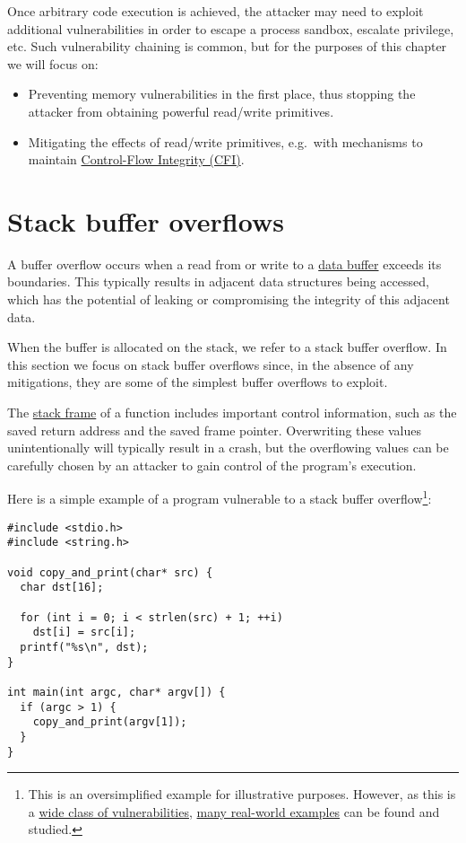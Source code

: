 \documentclass[a4paper,]{report}
\providecommand{\tightlist}{%
  \setlength{\itemsep}{0pt}\setlength{\parskip}{0pt}}
\begin{document}
Once arbitrary code execution is achieved, the attacker may need to
exploit additional vulnerabilities in order to escape a process sandbox,
escalate privilege, etc. Such vulnerability chaining is common, but for
the purposes of this chapter we will focus on:

\begin{itemize}
\tightlist
\item
  Preventing memory vulnerabilities in the first place, thus stopping
  the attacker from obtaining powerful read/write primitives.
\item
  Mitigating the effects of read/write primitives, e.g.~with mechanisms
  to maintain \protect\hyperlink{cfi}{Control-Flow Integrity (CFI)}.
\end{itemize}

\hypertarget{stack-buffer-overflows}{%
\section{Stack buffer overflows}\label{stack-buffer-overflows}}

A buffer overflow occurs when a read from or write to a
\href{https://en.wikipedia.org/wiki/Data_buffer}{data buffer} exceeds
its boundaries. This typically results in adjacent data structures being
accessed, which has the potential of leaking or compromising the
integrity of this adjacent data.

When the buffer is allocated on the stack, we refer to a stack buffer
overflow. In this section we focus on stack buffer overflows since, in
the absence of any mitigations, they are some of the simplest buffer
overflows to exploit.

The \href{https://en.wikipedia.org/wiki/Call_stack}{stack frame} of a
function includes important control information, such as the saved
return address and the saved frame pointer. Overwriting these values
unintentionally will typically result in a crash, but the overflowing
values can be carefully chosen by an attacker to gain control of the
program's execution.

Here is a simple example of a program vulnerable to a stack buffer
overflow\footnote{This is an oversimplified example for illustrative
  purposes. However, as this is a
  \href{https://cwe.mitre.org/data/definitions/121.html}{wide class of
  vulnerabilities},
  \href{https://www.cvedetails.com/vulnerability-list/cweid-121/vulnerabilities.html}{many
  real-world examples} can be found and studied.}:

\begin{verbatim}
#include <stdio.h>
#include <string.h>

void copy_and_print(char* src) {
  char dst[16];

  for (int i = 0; i < strlen(src) + 1; ++i)
    dst[i] = src[i];
  printf("%s\n", dst);
}

int main(int argc, char* argv[]) {
  if (argc > 1) {
    copy_and_print(argv[1]);
  }
}
\end{verbatim}
\end{document}
